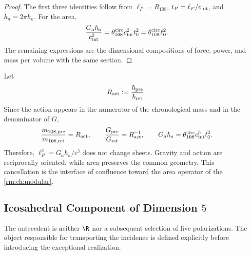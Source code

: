 \begin{proof}
The first three identities follow from
\(\ell_P=R_{108}\), \(t_P=\ell_P/c_{\rm int}\), and
\(h_a=2\pi\hbar_a\). For the area,
\[
\frac{G_a\hbar_a}{c_{\rm int}^3}
=\theta_{108}^{\rm circ}c_{\rm int}^2t_0^2
=\theta_{108}^{\rm circ}\ell_0^2.
\]
The remaining expressions are the dimensional compositions of force,
power, and mass per volume with the same section.
\end{proof}

Let
\begin{equation}
\label{rm:eq:gravity-Ract}
R_{\rm act}:=\frac{\hbar_{\rm pre}}{\hbar_{\rm ret}}.
\end{equation}
Since the action appears in the numerator of the chronological mass and in the
denominator of \(G\),
\begin{equation}
\label{rm:eq:gravity-twoway-covariance}
\frac{m_{108,\rm pre}}{m_{108,\rm ret}}=R_{\rm act},
\qquad
\frac{G_{\rm pre}}{G_{\rm ret}}=R_{\rm act}^{-1},
\qquad
G_a\hbar_a
=\theta_{108}^{\rm circ}c_{\rm int}^5t_0^2.
\end{equation}
Therefore, \(\ell_P^2=G_a\hbar_a/c^3\) does not change sheets. Gravity and
action are reciprocally oriented, while area preserves the
common geometry. This cancellation is the interface of confluence toward the area
operator of the \cref{rm:ch:modular}.

\subsection{Icosahedral Component of Dimension \(5\)}

The antecedent is neither \(\R\) nor a subsequent selection of five
polarizations. The object responsible for transporting the incidence is defined
explicitly before introducing the exceptional realization.

